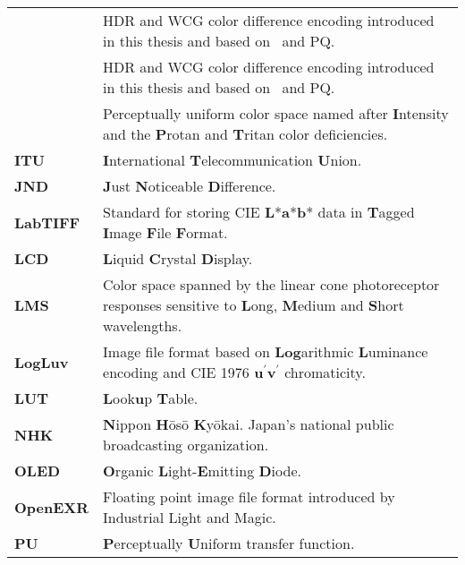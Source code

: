 \begin{flushleft}
\begin{longtable}[c]{@{}p{28.5mm}@{} p{120.5mm}}
	\textbf{\ICaCb}	& HDR and WCG color difference encoding introduced in this thesis and based on \IPT\ and PQ.\\
	\textbf{\ICtCp}	& HDR and WCG color difference encoding introduced in this thesis and based on \IPT\ and PQ.\\
	\textbf{\IPT}	& Perceptually uniform color space named after \textbf{I}ntensity and the \textbf{P}rotan and \textbf{T}ritan color deficiencies.\\
	\textbf{ITU}	& \textbf{I}nternational \textbf{T}elecommunication \textbf{U}nion.\\
	\textbf{JND}	& \textbf{J}ust \textbf{N}oticeable \textbf{D}ifference.\\
	\textbf{LabTIFF}& Standard for storing CIE \textbf{L}*\textbf{a}*\textbf{b}* data in \textbf{T}agged \textbf{I}mage \textbf{F}ile \textbf{F}ormat.\\
	\textbf{LCD}	& \textbf{L}iquid \textbf{C}rystal \textbf{D}isplay.\\
	\textbf{LMS}	& Color space spanned by the linear cone photoreceptor responses sensitive to \textbf{L}ong, \textbf{M}edium and \textbf{S}hort wavelengths.\\
	\textbf{LogLuv}	& Image file format based on \textbf{Log}arithmic \textbf{L}uminance encoding and CIE 1976 \textbf{u}$^\prime$\textbf{v}$^\prime$ chromaticity.\\
	\textbf{LUT}	& \textbf{L}ook\textbf{u}p \textbf{T}able.\\
	\textbf{NHK}    & \textbf{N}ippon \textbf{H}\={o}s\={o} \textbf{K}y\={o}kai. Japan's national public broadcasting organization.\\
	\textbf{OLED}	& \textbf{O}rganic \textbf{L}ight-\textbf{E}mitting \textbf{D}iode.\\
	\textbf{OpenEXR}& Floating point image file format introduced by Industrial Light and Magic.\\
	\textbf{PU}	    & \textbf{P}erceptually \textbf{U}niform transfer function.\\

\end{longtable}
\end{flushleft}
